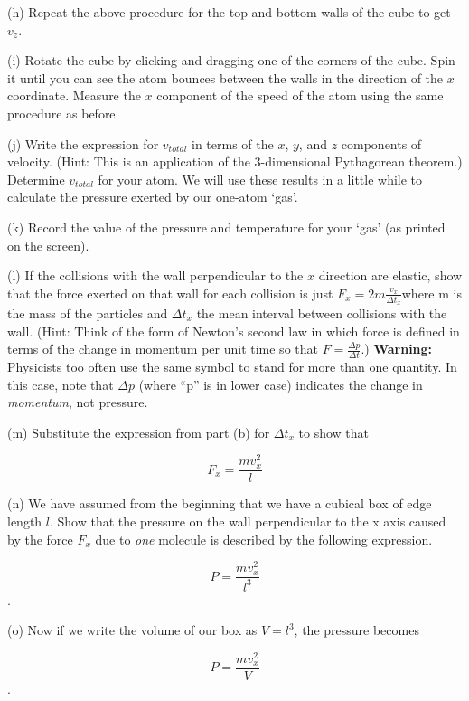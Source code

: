 \pagebreak[2]
(h) Repeat the above procedure for the top and bottom walls of the cube to get $v_z$.
\answerspace{15mm}

(i) Rotate the cube by clicking and dragging one of the corners of the cube.
Spin it until you can see the atom bounces between the walls in the direction of
the $x$ coordinate.
Measure the $x$ component of the speed of the atom using the same procedure as before.
\answerspace{15mm}

(j) Write the
expression for \( v_{total} \) in terms of the $x$, $y$, and $z$ components
of velocity. (Hint: This is an application of the 3-dimensional Pythagorean
theorem.) Determine $v_{total}$ for your atom.
We will use these results in a little while to calculate the pressure exerted by
our one-atom `gas'.
\answerspace{15mm}

(k) Record the value of the pressure and temperature for your `gas' (as printed on the screen).
\answerspace{15mm}

(l) If the collisions with the wall perpendicular to the $x$ direction
are elastic, show that the force exerted on that wall for each collision
is just \( F_{x}=2m\frac{v_{x}}{\Delta t_{x}} \)where m is the mass
of the particles and \( \Delta t_{x} \) the mean interval between
collisions with the wall. (Hint: Think of the form of Newton's second
law in which force is defined in terms of the change in momentum per
unit time so that \( F=\frac{\Delta p}{\Delta t} \).) \textbf{Warning:} Physicists too often use the same symbol to stand
for more than one quantity. In this case, note that \( \Delta p \)
(where {}``p'' is in lower case) indicates the change in \emph{momentum},
not pressure.
\answerspace{15mm}

(m) Substitute the expression from part (b) for \( \Delta t_{x} \)
to show that 

\[
F_{x}=\frac{mv_{x}^{2}}{l}\]

\answerspace{15mm}

(n) We have assumed from the beginning that we have a cubical box of edge length $l$. Show that the pressure on the wall perpendicular to the x axis caused by
the force \( F_{x} \) due to \emph{one} molecule is described by
the following expression.

\[
P=\frac{mv_{x}^{2}}{l^{3}}\].

\answerspace{5mm}

\pagebreak[2]
(o) Now if we write the volume of our box as \( V=l^{3} \), the pressure becomes

\[
P=\frac{mv_{x}^{2}}{V}\].

